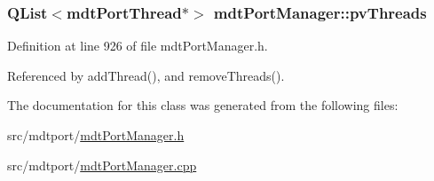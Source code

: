 \hypertarget{classmdt_port_manager_a8e0d49b789f8b01d469e84b487799573}{
\subsubsection[{pv\-Threads}]{\setlength{\rightskip}{0pt plus 5cm}Q\-List$<${\bf mdt\-Port\-Thread}$\ast$$>$ mdt\-Port\-Manager\-::pv\-Threads\hspace{0.3cm}{\ttfamily [protected]}}}\label{classmdt_port_manager_a8e0d49b789f8b01d469e84b487799573}


Definition at line 926 of file mdt\-Port\-Manager.\-h.



Referenced by add\-Thread(), and remove\-Threads().



The documentation for this class was generated from the following files\-:\begin{DoxyCompactItemize}
\item 
src/mdtport/\hyperlink{mdt_port_manager_8h}{mdt\-Port\-Manager.\-h}\item 
src/mdtport/\hyperlink{mdt_port_manager_8cpp}{mdt\-Port\-Manager.\-cpp}\end{DoxyCompactItemize}
